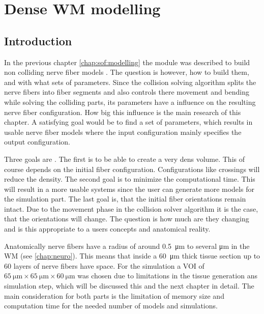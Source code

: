 \setcounter{chapter}{6}
\chapter{Dense \acs{WM} modelling}
\label{cha:model_analysis}
% 
\section{Introduction}
% 
In the previous chapter \cref{chap:sof:modelling} the module  was described to build non colliding nerve fiber models \cite{Matuschke2019, Matuschke2021}.
The question is however, how to build them, and with what sets of parameters.
Since the collision solving algorithm splits the nerve fibers into fiber segments and also controls there movement and bending while solving the colliding parts, its parameters have a influence on the resulting nerve fiber configuration.
How big this influence is the main research of this chapter.
A satisfying goal would be to find a set of parameters, which results in usable nerve fiber models where the input configuration mainly specifies the output configuration.
% 
\par
Three goals are \dummy{}.
The first is to be able to create a very dens volume.
This of course depends on the initial fiber configuration.
Configurations like crossings \eg{} will reduce the density.
The second goal is to minimize the computational time.
This will result in a more usable systems since the user can generate more models for the simulation part.
The last goal is, that the initial fiber orientations remain intact.
Due to the movement phase in the collision solver algorithm it is the case, that the orientations will change.
The question is how much are they changing and is this appropriate to a users concepts and anatomical reality.
\par
Anatomically nerve fibers have a radius of around \SI{0.5}{\micro\meter} to several \si{\micro\meter} in the \ac{WM} (see \cref{chap:neuro}).
This means that inside a \SI{60}{\micro\meter} thick tissue section up to 60 layers of nerve fibers have space.
For the simulation a \ac{VOI} of $\SI{65}{\micro\meter} \times \SI{65}{\micro\meter} \times \SI{60}{\micro\meter}$ was chosen due to limitations in the tissue generation ans simulation step, which will be discussed this and the next chapter in detail.
The main consideration for both parts is the limitation of memory size and computation time for the needed number of models and simulations.
\\
% 
